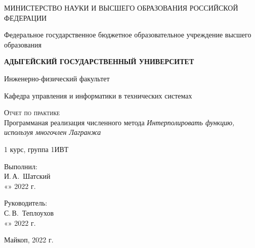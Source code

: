 \documentclass[12pt,a4paper]{scrartcl}
\begin{document}
	\begin{titlepage}
		\begin{center}
			\large
			МИНИСТЕРСТВО НАУКИ И ВЫСШЕГО ОБРАЗОВАНИЯ РОССИЙСКОЙ ФЕДЕРАЦИИ
			
			Федеральное государственное бюджетное образовательное учреждение высшего образования
			
			\textbf{АДЫГЕЙСКИЙ ГОСУДАРСТВЕННЫЙ УНИВЕРСИТЕТ}
			\vspace{0.25cm}
			
			Инженерно-физический факультет
			
			Кафедра управления и информатики в технических системах
			\vfill
			
			\vfill
			
			\textsc{Отчет по практике}\\[5mm]
			
			{\LARGE Программаная реализация численного метода \textit{Интерполировать функцию, используя многочлен Лагранжа 
		}}
			\bigskip
			
			1 курс, группа 1ИВТ
		\end{center}
		\vfill
		
		\newlength{\ML}
		\hfill\begin{minipage}{0.5\textwidth}
			Выполнил:\\
			\underline{\hspace{\ML}} И.\,А.~Шатский\\
			«\underline{\hspace{0.7cm}}» \underline{\hspace{2cm}} 2022 г.
		\end{minipage}%
		\bigskip
		
		\hfill\begin{minipage}{0.5\textwidth}
			Руководитель:\\
			\underline{\hspace{\ML}} С.\,В.~Теплоухов\\
			«\underline{\hspace{0.7cm}}» \underline{\hspace{2cm}} 2022 г.
		\end{minipage}%
		\vfill
		
		\begin{center}
			Майкоп, 2022 г.
		\end{center}
	\end{titlepage}
\end{document}
